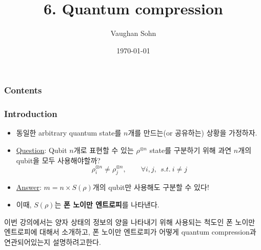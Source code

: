 \documentclass[9pt]{beamer}
\title{6. Quantum compression}
\date{\today}
\author{Vaughan Sohn}
\begin{document}
    \maketitle
    
    \begin{frame}
        \frametitle{Contents}
        \tableofcontents
    \end{frame}

    \begin{frame}
        \frametitle{Introduction}
        \begin{itemize}
            \item 동일한 arbitrary quantum state를 $n$개를 만드는(or 공유하는) 상황을 가정하자.
            \item \underline{Question}: Qubit $n$개로 표현할 수 있는 $\rho^{\otimes n}$ state를 구분하기 위해 과연 $n$개의 qubit을 모두 사용해야할까?
            \begin{equation*}
                \rho_i^{\otimes n} \ne {\rho}_j^{\otimes n}, \qquad \forall i,j,\ \ s.t.\ i \ne j
            \end{equation*}
            \item \underline{Answer}: $m = n \times S(\rho)$개의 qubit만 사용해도 구분할 수 있다!
            \item 이때, $S(\rho)$는 \textbf{폰 노이만 엔트로피}를 나타낸다. 
        \end{itemize}
        \vspace{0.4cm}
        이번 강의에서는 양자 상태의 정보의 양을 나타내기 위해 사용되는 척도인 폰 노이만 엔트로피에 대해서 소개하고, 폰 노이만 엔트로피가 어떻게 quantum compression과 연관되어있는지 설명하려고한다. 
    \end{frame}
\end{document}
